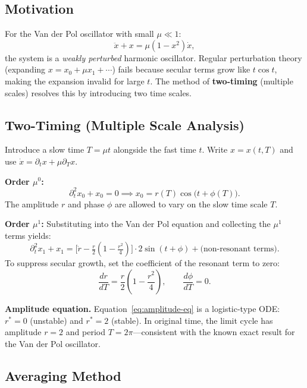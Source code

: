 \documentclass[11pt,letterpaper]{article}
\theoremstyle{definition}
\theoremstyle{plain}
\theoremstyle{remark}
\begin{document}
\subsection{Motivation}

For the Van der Pol oscillator with small $\mu \ll 1$:
\[
  \ddot{x} + x = \mu(1-x^2)\dot{x},
\]
the system is a \emph{weakly perturbed} harmonic oscillator.
Regular perturbation theory (expanding $x = x_0 + \mu x_1 + \cdots$)
fails because secular terms grow like $t\cos t$, making the expansion
invalid for large $t$.  The method of \textbf{two-timing} (multiple
scales) resolves this by introducing two time scales.

\subsection{Two-Timing (Multiple Scale Analysis)}

Introduce a slow time $T = \mu t$ alongside the fast time $t$.  Write
$x = x(t, T)$ and use $\dot{x} = \partial_t x + \mu\partial_T x$.

\textbf{Order $\mu^0$:}
\[
  \partial_t^2 x_0 + x_0 = 0 \implies
  x_0 = r(T)\cos\bigl(t + \phi(T)\bigr).
\]
The amplitude $r$ and phase $\phi$ are allowed to vary on the slow time
scale $T$.

\textbf{Order $\mu^1$:}  Substituting into the Van der Pol equation
and collecting the $\mu^1$ terms yields:
\[
  \partial_t^2 x_1 + x_1 = \bigl[\dot{r} - \tfrac{r}{2}(1-\tfrac{r^2}{4})\bigr]
  \cdot 2\sin(t+\phi) + \text{(non-resonant terms)}.
\]
To suppress secular growth, set the coefficient of the resonant term to
zero:
\begin{equation}\label{eq:amplitude-eq}
  \frac{dr}{dT} = \frac{r}{2}\!\left(1 - \frac{r^2}{4}\right), \qquad
  \frac{d\phi}{dT} = 0.
\end{equation}

\textbf{Amplitude equation.}  Equation~\eqref{eq:amplitude-eq} is a
logistic-type ODE: $r^* = 0$ (unstable) and $r^* = 2$ (stable).  In
original time, the limit cycle has amplitude $r = 2$ and period
$T = 2\pi$---consistent with the known exact result for the Van der Pol
oscillator.

\subsection{Averaging Method}
\end{document}
